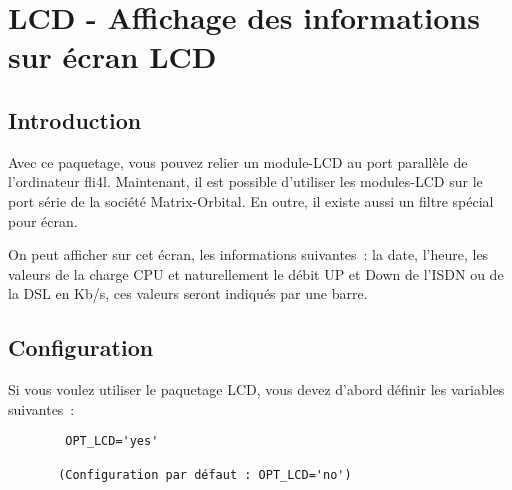 
{
  \section {LCD - Affichage des informations sur écran LCD}
}

\subsection{Introduction}


    Avec ce paquetage, vous pouvez relier un module-LCD au port parallèle de
    l'ordinateur fli4l. Maintenant, il est possible d'utiliser les modules-LCD
    sur le port série de la société Matrix-Orbital. En outre, il existe aussi
    un filtre spécial pour écran.

    On peut afficher sur cet écran, les informations suivantes~: la date, l'heure,
    les valeurs de la charge CPU et naturellement le débit UP et Down de l'ISDN
    ou de la DSL en Kb/s, ces valeurs seront indiqués par une barre.


\subsection{Configuration}

    Si vous voulez utiliser le paquetage LCD, vous devez d'abord définir les
    variables suivantes~:

\begin{example}
\begin{verbatim}
        OPT_LCD='yes'

       (Configuration par défaut : OPT_LCD='no')
\end{verbatim}
\end{example}



